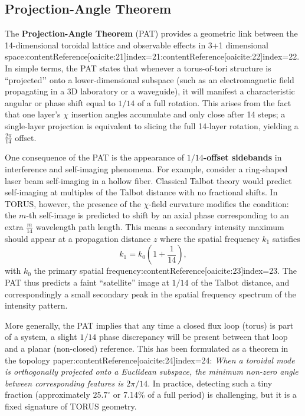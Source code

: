\documentclass[12pt]{article}
\begin{document}
\subsection{Projection-Angle Theorem}
The \textbf{Projection-Angle Theorem} (PAT) provides a geometric link between the 14-dimensional toroidal lattice and observable effects in 3+1 dimensional space:contentReference[oaicite:21]{index=21}:contentReference[oaicite:22]{index=22}. In simple terms, the PAT states that whenever a torus-of-tori structure is ``projected’’ onto a lower-dimensional subspace (such as an electromagnetic field propagating in a 3D laboratory or a waveguide), it will manifest a characteristic angular or phase shift equal to $1/14$ of a full rotation. This arises from the fact that one layer’s $\chi$ insertion angles accumulate and only close after 14 steps; a single-layer projection is equivalent to slicing the full 14-layer rotation, yielding a $\frac{2\pi}{14}$ offset.

One consequence of the PAT is the appearance of \textbf{$1/14$-offset sidebands} in interference and self-imaging phenomena. For example, consider a ring-shaped laser beam self-imaging in a hollow fiber. Classical Talbot theory would predict self-imaging at multiples of the Talbot distance with no fractional shifts. In TORUS, however, the presence of the $\chi$-field curvature modifies the condition: the $m$-th self-image is predicted to shift by an axial phase corresponding to an extra $\frac{m}{14}$ wavelength path length. This means a secondary intensity maximum should appear at a propagation distance $z$ where the spatial frequency $k_1$ satisfies 
\[ k_1 = k_0 \left(1 + \frac{1}{14}\right), \] 
with $k_0$ the primary spatial frequency:contentReference[oaicite:23]{index=23}. The PAT thus predicts a faint “satellite” image at $1/14$ of the Talbot distance, and correspondingly a small secondary peak in the spatial frequency spectrum of the intensity pattern.

More generally, the PAT implies that any time a closed flux loop (torus) is part of a system, a slight $1/14$ phase discrepancy will be present between that loop and a planar (non-closed) reference. This has been formulated as a theorem in the topology paper:contentReference[oaicite:24]{index=24}: \emph{When a toroidal mode is orthogonally projected onto a Euclidean subspace, the minimum non-zero angle between corresponding features is $2\pi/14$}. In practice, detecting such a tiny fraction (approximately $25.7^\circ$ or 7.14\% of a full period) is challenging, but it is a fixed signature of TORUS geometry.
\end{document}
